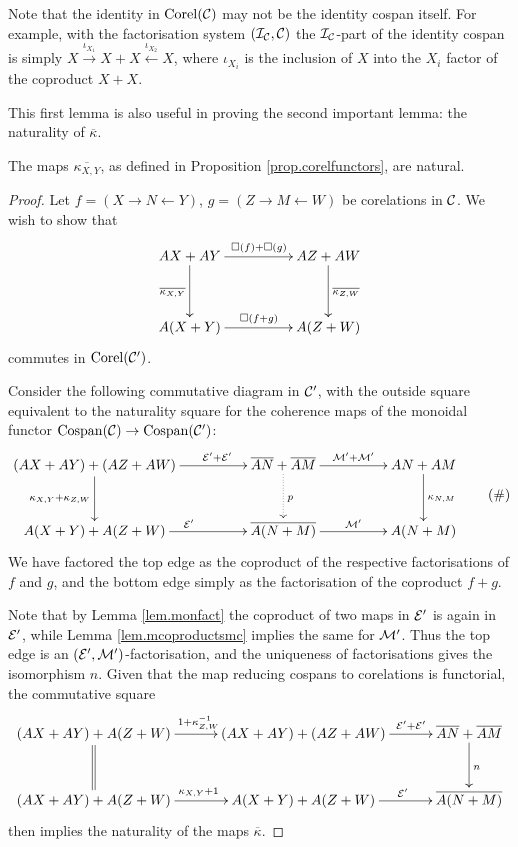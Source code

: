 Note that the identity in $\operatorname{{Corel}}(\mathcal C)$ may not be the identity cospan itself.
For example, with the factorisation system $(\mathcal I_{\mathcal C}, \mathcal C)$ the $\mathcal
I_{\mathcal C}$-part of the identity cospan is simply $X \xrightarrow{\iota_{X_1}}
X+X \xleftarrow{\iota_{X_2}} X$, where $\iota_{X_i}$ is the inclusion of
$X$ into the $X_i$ factor of the coproduct $X+X$.

This first lemma is also useful in proving the second important lemma: the
naturality of $\overline{\kappa}$.

\begin{lemma} \label{lem.corelfunmonoidal}
  The maps $\overline{\kappa_{X,Y}}$, as defined in Proposition
  \ref{prop.corelfunctors}, are natural.
\end{lemma}
\begin{proof}
  Let $f = (X \longrightarrow N \longleftarrow Y)$, $g= (Z \longrightarrow M
  \longleftarrow W)$ be corelations in $\mathcal C$. We wish to show that
  \[
    \xymatrixcolsep{4pc}
    \xymatrixrowsep{3pc}
    \xymatrix{
      AX+AY \ar[r]^{\square(f)+\square(g)}
      \ar[d]_{\overline{\kappa_{X,Y}}} & 
      AZ+AW \ar[d]^{\overline{\kappa_{Z,W}}} \\
      A(X+Y) \ar[r]^{\square(f+g)} & A(Z+W)
    }
  \]
  commutes in $\operatorname{{Corel}}(\mathcal C')$. 

  Consider the following commutative diagram in $\mathcal C'$, with the outside
  square equivalent to the naturality square for the coherence maps of the
  monoidal functor \linebreak $\operatorname{{Cospan}}(\mathcal C) \to \operatorname{{Cospan}}(\mathcal C')$:
  \[ \label{diag.natural}
    \begin{aligned}
      \xymatrixcolsep{4pc}
      \xymatrixrowsep{2.5pc}
      \xymatrix{
	(AX+AY)+(AZ+AW) \ar[r]^(.65){\mc E'+\mc E'}
	\ar[d]_{\kappa_{X,Y}+\kappa_{Z,W}} & 
	\overline{AN}+\overline{AM} \ar[r]^{\mc M'+\mc M'} \ar@{.>}[d]^{p} & 
	AN+AM \ar[d]^{\kappa_{N,M}}\\
	A(X+Y)+A(Z+W) \ar[r]^{\mc E'} & \overline{A(N+M)} \ar[r]^{\mc M'} & A(N+M)
      }
    \end{aligned}
    \tag{$\#$}
  \]
  We have factored the top edge as the coproduct of the respective
  factorisations of $f$ and $g$, and the bottom edge simply as the factorisation
  of the coproduct $f+g$. 

  Note that by Lemma \ref{lem.monfact} the coproduct of two maps in $\mathcal E'$ is
  again in $\mathcal E'$, while Lemma \ref{lem.mcoproductsmc} implies the same for
  $\mathcal M'$. Thus the top edge is an $(\mathcal E',\mathcal M')$-factorisation, and the
  uniqueness of factorisations gives the isomorphism $n$. 
  Given that the map reducing cospans to corelations is functorial, the
  commutative square
  \[
    \xymatrixcolsep{2.5pc}
    \xymatrixrowsep{2.5pc}
    \xymatrix{
      (AX+AY)+A(Z+W) \ar[r]^{1+\kappa_{Z,W}^{-1}} \ar@{=}[d] & (AX+AY)+(AZ+AW)
      \ar[r]^(.65){\mc E'+\mc E'} & 
      \overline{AN}+\overline{AM} \ar[d]^{n} \\
      (AX+AY)+A(Z+W) \ar[r]^{\kappa_{X,Y}+1} & A(X+Y)+A(Z+W) \ar[r]^(.6){\mc E'} & 
      \overline{A(N+M)}
    }
  \]
  then implies the naturality of the maps $\overline{\kappa}$.
\end{proof}


